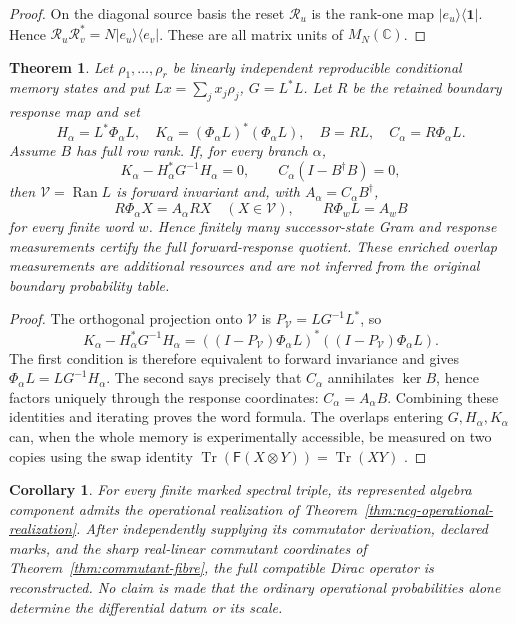 \documentclass[11pt]{article}
\newtheorem{theorem}{Theorem}[section]
\newtheorem{corollary}[corollary]{Corollary}
\theoremstyle{definition}
\theoremstyle{remark}
\theoremstyle{definition}
\theoremstyle{remark}
\newcommand{\C}{\mathbb C}
\newcommand{\Tr}{\operatorname{Tr}}
\newcommand{\Ran}{\operatorname{Ran}}
\begin{document}
\begin{proof}
On the diagonal source basis the reset $\mathcal R_u$ is the rank-one map
$|e_u\rangle\langle\mathbf 1|$.  Hence
$\mathcal R_u\mathcal R_v^*=N|e_u\rangle\langle e_v|$.  These are all matrix
units of $M_N(\C)$.
\end{proof}


\begin{theorem}
\label{thm:ncg-enriched-closure}
Let $\rho_1,\ldots,\rho_r$ be linearly independent reproducible conditional
memory states and put $Lx=\sum_jx_j\rho_j$, $G=L^*L$.  Let $R$ be the retained
boundary response map and set
\[
 H_\alpha=L^*\Phi_\alpha L,
 \quad K_\alpha=(\Phi_\alpha L)^*(\Phi_\alpha L),
 \quad B=RL,
 \quad C_\alpha=R\Phi_\alpha L.
\]
Assume $B$ has full row rank.  If, for every branch $\alpha$,
\[
 K_\alpha-H_\alpha^*G^{-1}H_\alpha=0,
 \qquad
 C_\alpha(I-B^\dagger B)=0,
\]
then $\mathcal V=\Ran L$ is forward invariant and, with
$A_\alpha=C_\alpha B^\dagger$,
\[
 R\Phi_\alpha X=A_\alpha RX\quad(X\in\mathcal V),
 \qquad
 R\Phi_wL=A_wB
\]
for every finite word $w$.  Hence finitely many successor-state Gram and response
measurements certify the full forward-response quotient.  These enriched overlap
measurements are additional resources and are not inferred from the original
boundary probability table.
\end{theorem}

\begin{proof}
The orthogonal projection onto $\mathcal V$ is $P_\mathcal V=LG^{-1}L^*$, so
\[
 K_\alpha-H_\alpha^*G^{-1}H_\alpha
 =((I-P_\mathcal V)\Phi_\alpha L)^*((I-P_\mathcal V)\Phi_\alpha L).
\]
The first condition is therefore equivalent to forward invariance and gives
$\Phi_\alpha L=LG^{-1}H_\alpha$.  The second says precisely that $C_\alpha$
annihilates $\ker B$, hence factors uniquely through the response coordinates:
$C_\alpha=A_\alpha B$.  Combining these identities and iterating proves the
word formula.  The overlaps entering $G,H_\alpha,K_\alpha$ can, when the whole
memory is experimentally accessible, be measured on two copies using the swap
identity $\Tr(\mathsf F(X\otimes Y))=\Tr(XY)$ \cite{EkertEtAl2002}.
\end{proof}

\begin{corollary}
\label{cor:ncg-operational-calibrated-triples}
For every finite marked spectral triple, its represented algebra component admits
the operational realization of Theorem~\ref{thm:ncg-operational-realization}.
After independently supplying its commutator derivation, declared marks, and the
sharp real-linear commutant coordinates of Theorem~\ref{thm:commutant-fibre}, the full
compatible Dirac operator is reconstructed.  No claim is made that the ordinary
operational probabilities alone determine the differential datum or its scale.
\end{corollary}
\end{document}
